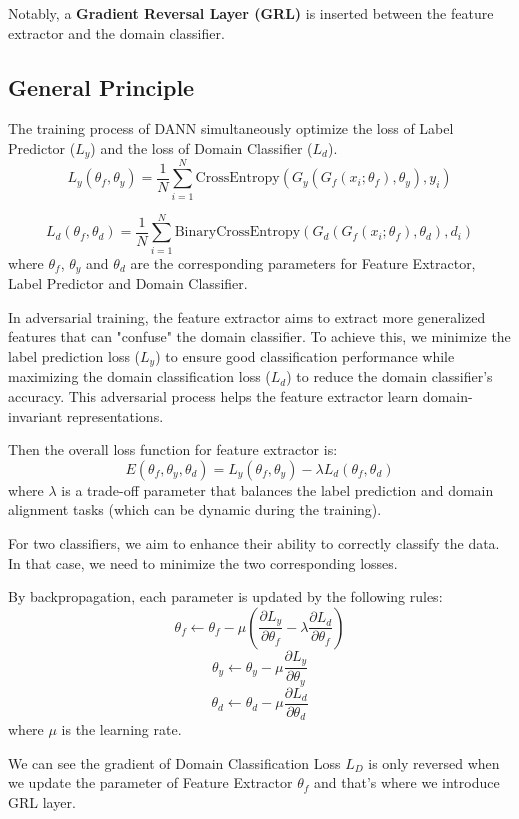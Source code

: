 \documentclass{rapportECL}
\begin{document}
Notably, a \textbf{Gradient Reversal Layer (GRL)} is inserted between the feature extractor and the domain classifier. 

\subsection{General Principle}
The training process of DANN simultaneously optimize the loss of Label Predictor ($L_y$) and the loss of Domain Classifier ($L_d$).
\[
L_y(\theta_f, \theta_y) = \frac{1}{N} \sum_{i=1}^{N} \text{CrossEntropy}(G_y(G_f(x_i; \theta_f), \theta_y), y_i)
\]

\[
L_d(\theta_f, \theta_d) = \frac{1}{N} \sum_{i=1}^{N} \text{BinaryCrossEntropy}(G_d(G_f(x_i; \theta_f), \theta_d), d_i)
\]
where $\theta_f$, $\theta_y$ and $\theta_d$ are the corresponding parameters for Feature Extractor, Label Predictor and Domain Classifier. 
    
In adversarial training, the feature extractor aims to extract more generalized features that can "confuse" the domain classifier. To achieve this, we minimize the label prediction loss ($L_y$) to ensure good classification performance while maximizing the domain classification loss ($L_d$) to reduce the domain classifier's accuracy. This adversarial process helps the feature extractor learn domain-invariant representations.

Then the overall loss function for feature extractor is:
\[
E(\theta_f, \theta_y, \theta_d) = L_y(\theta_f, \theta_y) - \lambda L_d(\theta_f, \theta_d)
\]
where \(\lambda\) is a trade-off parameter that balances the label prediction and domain alignment tasks (which can be dynamic during the training).


For two classifiers, we aim to enhance their ability to correctly classify the data. In that case, we need to minimize the two corresponding losses. 

By backpropagation, each parameter is updated by the following rules:
\[
\theta_f \leftarrow \theta_f - \mu \left( \frac{\partial L_y}{\partial \theta_f} - \lambda \frac{\partial L_d}{\partial \theta_f} \right)
\]
\[
\theta_y \leftarrow \theta_y - \mu \frac{\partial L_y}{\partial \theta_y}
\]
\[
\theta_d \leftarrow \theta_d - \mu \frac{\partial L_d}{\partial \theta_d}
\]
where $\mu$ is the learning rate.

We can see the gradient of Domain Classification Loss $L_D$ is only reversed when we update the parameter of Feature Extractor $\theta_f$ and that's where we introduce GRL layer.
\end{document}
